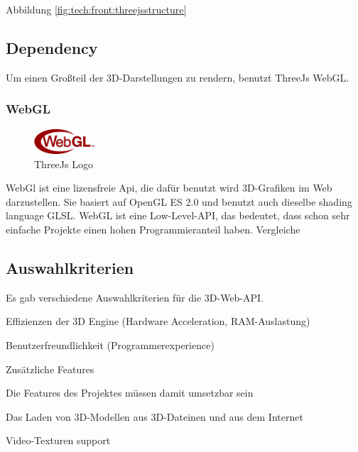 Abbildung \ref{fig:tech:front:threejsstructure} \cite{ThreeJsFund}

\subsection{Dependency}
\label{ch::ThreeJsDependency}
Um einen Großteil der 3D-Darstellungen zu rendern, benutzt ThreeJs WebGL.

\subsubsection{WebGL}
\label{ch::webgl}
\begin{figure}
    \begin{center}
      \includegraphics[width=0.2\textwidth]{pics/WebGL_Logo.png}
     \caption{ThreeJs Logo}
    \end{center}
\end{figure}
WebGl ist eine lizensfreie Api, die dafür benutzt wird 3D-Grafiken im Web darzustellen. Sie basiert auf OpenGL ES 2.0 und benutzt auch dieselbe shading language GLSL. WebGL ist eine Low-Level-API, das bedeutet, dass schon sehr einfache Projekte einen hohen Programmieranteil haben. Vergleiche\cite[WebGl Getting Started]{WebglGettingStarted}


\subsection{Auswahlkriterien}
Es gab verschiedene Auswahlkriterien für die 3D-Web-API.
\begin{compactitem}
  \item Effizienzen der 3D Engine (Hardware Acceleration, RAM-Auslastung)
  \item Benutzerfreundlichkeit (Programmerexperience)
  \item Zusätzliche Features
  \item Die Features des Projektes müssen damit umsetzbar sein
  \begin{compactenum}
    \item Das Laden von 3D-Modellen aus 3D-Dateinen und aus dem Internet
    \item Video-Texturen support
  \end{compactenum}
\end{compactitem}

